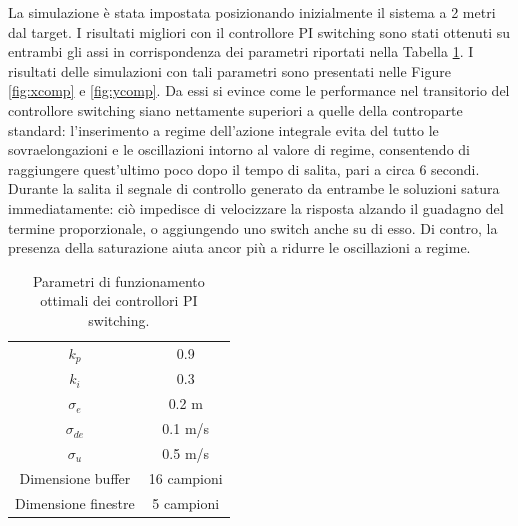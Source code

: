La simulazione è stata impostata posizionando inizialmente il sistema a 2 metri dal target. I risultati migliori con il controllore PI switching sono stati ottenuti su entrambi gli assi in corrispondenza dei parametri riportati nella Tabella \ref{tab:cparams}. I risultati delle simulazioni con tali parametri sono presentati nelle Figure \ref{fig:xcomp} e \ref{fig:ycomp}. Da essi si evince come le performance nel transitorio del controllore switching siano nettamente superiori a quelle della controparte standard: l'inserimento a regime dell'azione integrale evita del tutto le sovraelongazioni e le oscillazioni intorno al valore di regime, consentendo di raggiungere quest'ultimo poco dopo il tempo di salita, pari a circa 6 secondi. Durante la salita il segnale di controllo generato da entrambe le soluzioni satura immediatamente: ciò impedisce di velocizzare la risposta alzando il guadagno del termine proporzionale, o aggiungendo uno switch anche su di esso. Di contro, la presenza della saturazione aiuta ancor più a ridurre le oscillazioni a regime.

\begin{table}
    \centering
    \begin{tabular}{c|c}
        $k_p$ & 0.9 \\
        $k_i$ & 0.3 \\
        $\sigma_e$ & 0.2 m\\
        $\sigma_{de}$ & 0.1 m/s\\
        $\sigma_{u}$ & 0.5 m/s\\
        Dimensione buffer & 16 campioni\\
        Dimensione finestre & 5 campioni
    \end{tabular}
    \caption{Parametri di funzionamento ottimali dei controllori PI switching.}
    \label{tab:cparams}
\end{table}

